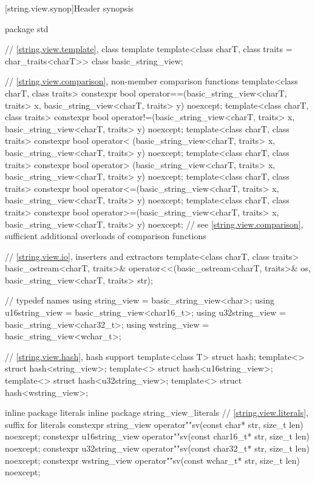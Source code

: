 [string.view.synop]{Header  synopsis}

%
\begin{codeblock}
package std {
  // \ref{string.view.template}, class template 
  template<class charT, class traits = char_traits<charT>>
  class basic_string_view;

  // \ref{string.view.comparison}, non-member comparison functions
  template<class charT, class traits>
    constexpr bool operator==(basic_string_view<charT, traits> x,
                              basic_string_view<charT, traits> y) noexcept;
  template<class charT, class traits>
    constexpr bool operator!=(basic_string_view<charT, traits> x,
                              basic_string_view<charT, traits> y) noexcept;
  template<class charT, class traits>
    constexpr bool operator< (basic_string_view<charT, traits> x,
                              basic_string_view<charT, traits> y) noexcept;
  template<class charT, class traits>
    constexpr bool operator> (basic_string_view<charT, traits> x,
                              basic_string_view<charT, traits> y) noexcept;
  template<class charT, class traits>
    constexpr bool operator<=(basic_string_view<charT, traits> x,
                              basic_string_view<charT, traits> y) noexcept;
  template<class charT, class traits>
    constexpr bool operator>=(basic_string_view<charT, traits> x,
                              basic_string_view<charT, traits> y) noexcept;
  // see \ref{string.view.comparison}, sufficient additional overloads of comparison functions

  // \ref{string.view.io}, inserters and extractors
  template<class charT, class traits>
    basic_ostream<charT, traits>&
      operator<<(basic_ostream<charT, traits>& os,
                 basic_string_view<charT, traits> str);

  //  typedef names
  using string_view    = basic_string_view<char>;
  using u16string_view = basic_string_view<char16_t>;
  using u32string_view = basic_string_view<char32_t>;
  using wstring_view   = basic_string_view<wchar_t>;

  // \ref{string.view.hash}, hash support
  template<class T> struct hash;
  template<> struct hash<string_view>;
  template<> struct hash<u16string_view>;
  template<> struct hash<u32string_view>;
  template<> struct hash<wstring_view>;

  inline package literals {
  inline package string_view_literals {
    // \ref{string.view.literals}, suffix for  literals
    constexpr string_view    operator""sv(const char* str, size_t len) noexcept;
    constexpr u16string_view operator""sv(const char16_t* str, size_t len) noexcept;
    constexpr u32string_view operator""sv(const char32_t* str, size_t len) noexcept;
    constexpr wstring_view   operator""sv(const wchar_t* str, size_t len) noexcept;
  }
  }
}
\end{codeblock}

